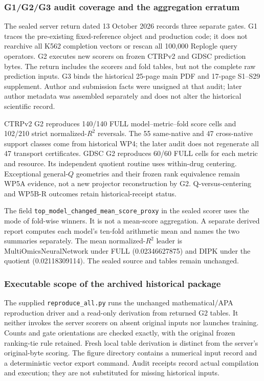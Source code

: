 \documentclass[11pt]{article}
\begin{document}
\subsubsection{G1/G2/G3 audit coverage and the aggregation erratum}
The sealed server return dated 13 October 2026 records three separate gates. G1 traces the pre-existing fixed-reference object and production code; it does not rearchive all K562 completion vectors or rescan all 100,000 Replogle query operators. G2 executes new scorers on frozen CTRPv2 and GDSC prediction bytes. The return includes the scorers and fold tables, but not the complete raw prediction inputs. G3 binds the historical 25-page main PDF and 17-page S1--S29 supplement. Author and submission facts were unsigned at that audit; later author metadata was assembled separately and does not alter the historical scientific record.

CTRPv2 G2 reproduces 140/140 FULL model--metric--fold score cells and 102/210 strict normalized-$R^2$ reversals. The 55 same-native and 47 cross-native support classes come from historical WP4; the later audit does not regenerate all 47 transport certificates. GDSC G2 reproduces 60/60 FULL cells for each metric and resource. Its independent quotient routine uses within-drug centering. Exceptional general-$Q$ geometries and their frozen rank equivalence remain WP5A evidence, not a new projector reconstruction by G2. Q-versus-centering and WP5B-R outcomes retain historical-receipt status.

The field \texttt{top\_model\_changed\_mean\_score\_proxy} in the sealed scorer uses the mode of fold-wise winners. It is not a mean-score aggregation. A separate derived report computes each model's ten-fold arithmetic mean and names the two summaries separately. The mean normalized-$R^2$ leader is MultiOmicsNeuralNetwork under FULL (0.02346627875) and DIPK under the quotient (0.02118309114). The sealed source and tables remain unchanged.

\subsubsection{Executable scope of the archived historical package}
The supplied \texttt{reproduce\_all.py} runs the unchanged mathematical/APA reproduction driver and a read-only derivation from returned G2 tables. It neither invokes the server scorers on absent original inputs nor launches training. Counts and gate orientations are checked exactly, with the original frozen ranking-tie rule retained. Fresh local table derivation is distinct from the server's original-byte scoring. The figure directory contains a numerical input record and a deterministic vector export command. Audit receipts record actual compilation and execution; they are not substituted for missing historical inputs.
\end{document}
